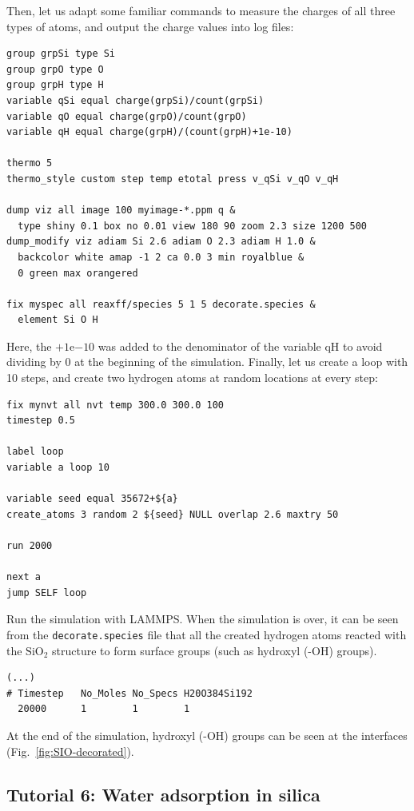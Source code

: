 \documentclass[9pt,tutorial]{livecoms}
\newcommand{\lmpcmd}[1]{\hspace{0pt}\colorbox{listing}{\textcolor{command}{\small{#1}}}\hspace{0pt}} %
\newcommand{\flecmd}[1]{\textcolor{command}{\texttt{#1}}} %
\begin{document}
Then, let us adapt some familiar commands to measure the charges of all three
types of atoms, and output the charge values into log files:
\begin{lstlisting}
group grpSi type Si
group grpO type O
group grpH type H
variable qSi equal charge(grpSi)/count(grpSi)
variable qO equal charge(grpO)/count(grpO)
variable qH equal charge(grpH)/(count(grpH)+1e-10)

thermo 5
thermo_style custom step temp etotal press v_qSi v_qO v_qH

dump viz all image 100 myimage-*.ppm q &
  type shiny 0.1 box no 0.01 view 180 90 zoom 2.3 size 1200 500
dump_modify viz adiam Si 2.6 adiam O 2.3 adiam H 1.0 &
  backcolor white amap -1 2 ca 0.0 3 min royalblue &
  0 green max orangered

fix myspec all reaxff/species 5 1 5 decorate.species &
  element Si O H
\end{lstlisting}
Here, the $+1 \mathrm{e}{-10}$ was added to the denominator of the \lmpcmd{variable qH}
to avoid dividing by 0 at the beginning of the simulation.  Finally, let us
create a loop with 10 steps, and create two hydrogen atoms at random locations at
every step:
\begin{lstlisting}
fix mynvt all nvt temp 300.0 300.0 100
timestep 0.5

label loop
variable a loop 10

variable seed equal 35672+${a}
create_atoms 3 random 2 ${seed} NULL overlap 2.6 maxtry 50

run 2000

next a
jump SELF loop
\end{lstlisting}

Run the simulation with LAMMPS.  When the simulation is over,
it can be seen from the \flecmd{decorate.species} file that
all the created hydrogen atoms reacted with the $\text{SiO}_{2}$ structure to
form surface groups (such as hydroxyl (-OH) groups).
\begin{lstlisting}
(...)
# Timestep   No_Moles No_Specs H20O384Si192
  20000      1        1        1
\end{lstlisting}
At the end of the simulation, hydroxyl (-OH) groups can be seen at the interfaces
(Fig.~\ref{fig:SIO-decorated}).

\subsection{Tutorial 6: Water adsorption in silica}
\label{gcmc-silica-label}
\end{document}
